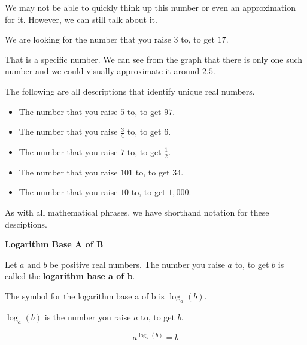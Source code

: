 \documentclass{ximera}
\begin{document}
We may not be able to quickly think up this number or even an approximation for it.  However, we can still talk about it.

\begin{center}
We are looking for the number that you raise $3$ to, to get $17$.
\end{center}


That is a specific number. We can see from the graph that there is only one such number and we could visually approximate it around $2.5$.


\begin{example}
The following are all descriptions that identify unique real numbers.

\begin{itemize}
\item The number that you raise $5$ to, to get $97$.
\item The number that you raise $\frac{3}{4}$ to, to get $6$.
\item The number that you raise $7$ to, to get $\frac{1}{2}$.
\item The number that you raise $101$ to, to get $34$.
\item The number that you raise $10$ to, to get $1,000$.
\end{itemize}

\end{example}



As with all mathematical phrases, we have shorthand notation for these desciptions.








\begin{definition} \textbf{\textcolor{green!50!black}{Logarithm Base A of B}}

Let $a$ and $b$ be positive real numbers.  The number  you raise $a$ to, to get $b$ is called the \textbf{logarithm base a of b}.

The symbol for the logarithm base a of b is $\log_a(b)$.


$\log_a(b)$ is  the number you raise $a$ to, to get $b$.

\[     a^{\log_a(b)} = b          \]




\end{definition}
\end{document}

